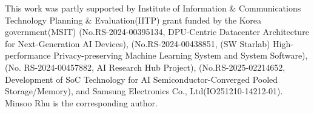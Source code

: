 \begin{acks}
\label{sect:ack}
This work was partly supported by Institute of Information \& Communications Technology Planning \& Evaluation(IITP) grant funded by the Korea government(MSIT) 
(No.RS-2024-00395134, DPU-Centric Datacenter Architecture for Next-Generation AI Devices),
(No.RS-2024-00438851, (SW Starlab) High-performance Privacy-preserving Machine Learning System and System Software), 
(No. RS-2024-00457882, AI Research Hub Project), 
(No.RS-2025-02214652, Development of SoC Technology for AI Semiconductor-Converged Pooled Storage/Memory),
and 
Samsung Electronics Co., Ltd(IO251210-14212-01).
Minsoo Rhu is the corresponding author.
\end{acks}